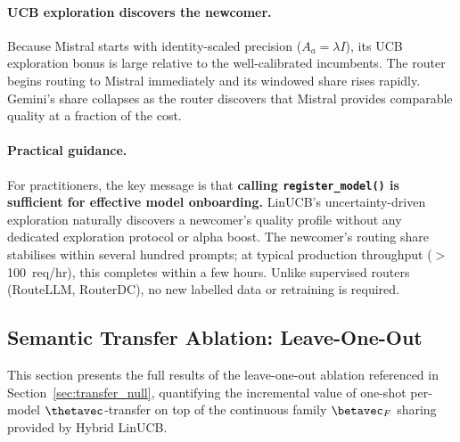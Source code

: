 

\paragraph{UCB exploration discovers the newcomer.}
Because Mistral starts with identity-scaled precision ($A_a{=}\lambda I$),
its UCB exploration bonus is large relative to the well-calibrated
incumbents.
The router begins routing to Mistral immediately and its windowed share
rises rapidly.  Gemini's share collapses as the router discovers that
Mistral provides comparable quality at a fraction of the cost.

\paragraph{Practical guidance.}
For practitioners, the key message is that \textbf{calling
\texttt{register\_model()} is sufficient for effective model onboarding.}
LinUCB's uncertainty-driven exploration naturally discovers a newcomer's
quality profile without any dedicated exploration protocol or alpha boost.
The newcomer's routing share stabilises within several hundred prompts;
at typical production throughput ($>$100~req/hr), this completes within
a few hours.
Unlike supervised routers (RouteLLM, RouterDC), no new labelled data or
retraining is required.


\subsection{Semantic Transfer Ablation: Leave-One-Out}
\label{app:semantic_transfer_ablation}

This section presents the full results of the leave-one-out ablation
referenced in Section~\ref{sec:transfer_null}, quantifying the incremental
value of one-shot per-model $\thetavec$-transfer on top of the continuous
family $\betavec_F$ sharing provided by Hybrid LinUCB.

